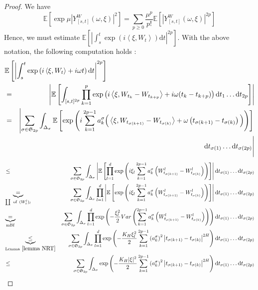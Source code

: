 \documentclass[11pt,a4paper,draft,reqno]{amsart}
\theoremstyle{definition}
\newcommand{\expect}{\mathbb{E}}
\newcommand{\dd}{\mathrm{d}}
\newcommand{\la}{\left\langle}
\newcommand{\ra}{\right\rangle}
\renewcommand{\S}{\mathfrak{S}}
\begin{document}
\begin{proof}
We have
\begin{equation*}
\expect\left[\exp{\mu |Y_{[s,t]}^W(\omega,\xi)|^2}\right]=\sum_{p \ge 0} \frac {\mu^p} {p!}
\expect\left[|Y_{[s,t]}^W(\omega,\xi)|^{2p}\right]
\end{equation*}
Hence, we must estimate
$\expect[|\int_{s}^t \exp( i \la \xi , W_t \ra ) \dd t |^{2p}]$.
With the above notation, the following computation holds :
\begin{eqnarray*}
\lefteqn{\expect\left[\left|\int_{s}^t \exp\left( i \la \xi , W_t \ra + i \omega t\right) \dd t \right|^{2p}\right]}\\
&= &
\left|
	\expect\left[
\int_{ [s,t]^{2p }}\prod_{k=1}^p \exp \left( i \la \xi , W_{t_k}-W_{t_{k+p}} \ra +i \omega (t_k-t_{k+p})\right) \dd t_{1}\dots \dd
t_{2p}
	\right]
\right|\\
& = & 
\left|
	\sum_{\sigma\in\S_{2p}}
		\int_{\Delta_\sigma}
			\expect\left[
\exp\left( i \sum_{k=1}^{2p-1}a_k^{\sigma}\Big( \la \xi, W_{t_{\sigma(k+1)}}-W_{t_{\sigma(k)}}\ra + \omega\left(t_{\sigma(k+1)} -
t_{\sigma(k)}\right)\Big)\right)\right]
		\right.\\ 
		&& 
		\quad\quad\quad\quad\quad\quad\quad\quad\quad\quad\quad\quad\quad\quad\quad\quad\quad\quad\quad\quad\quad\quad\quad\quad\quad\quad
		 \dd t_{\sigma(1)}\dots \dd t_{\sigma(2p)}
\Bigg|\\
\end{eqnarray*}
\begin{eqnarray*}
& \le &
\sum_{\sigma\in\S_{2p}}
	\int_{\Delta_\sigma}
		\left|\expect\left[
\prod_{l=1}^{d}\exp\left( i \xi_l \sum_{k=1}^{2p-1}a_k^{\sigma}\left(W_{t_{\sigma(k+1)}}^l-W_{t_{\sigma(k)}}^l\right) \right)		
		\right]\right|
	\dd t_{\sigma(1)}\dots \dd t_{\sigma(2p)}
\\
& \underbrace {=}_{\coprod\ \mathrm {of\ } (W_t^l)_{l} } & 
\sum_{\sigma\in\S_{2p}}
	\int_{\Delta_\sigma}
		\prod_{l=1}^{d}
			\left|\expect\left[
				\exp\left( 
					i \xi_l \sum_{k=1}^{2p-1}a_k^{\sigma} \left(W_{t_{\sigma(k+1)}}^l-W_{t_{\sigma(k)}}^l\right) 
				\right)
			\right]\right|
	\dd t_{\sigma(1)}\dots \dd t_{\sigma(2p)}
\\
& \underbrace {=}_{\mathrm{mBf}} &
\sum_{\sigma\in\S_{2p}}
	\int_{\Delta_\sigma}
		\prod_{l=1}^{d}
			\exp\left(
				-\frac {\xi_l^2} 2 Var\left(\sum_{k=1}^{2p-1}a_k^{\sigma}\left(W_{t_{\sigma(k+1)}}^l-W_{t_{\sigma(k)}}^l\right)\right)
			\right)
	\dd t_{\sigma(1)}\dots \dd t_{\sigma(2p)}
\\
& \underbrace {\le}_{\mathrm{Lemma} \ \ref{lemma NRT}} &
\sum_{\sigma\in\S_{2p}}
	\int_{\Delta_\sigma}
		\prod_{l=1}^{d}
			\exp\left(
				-\frac {K_H \xi_l^2} 2 \sum_{k=1}^{2p-1}\left(a_k^{\sigma}\right)^2\left|t_{\sigma(k+1)}-t_{\sigma(k)}\right|^{2H}
			\right)
	\dd t_{\sigma(1)}\dots \dd t_{\sigma(2p)}
\\
& \le & 
\sum_{\sigma\in\S_{2p}}
	\int_{\Delta_\sigma}
		\exp\left(
				-\frac {K_H |\xi|^2} 2 \sum_{k=1}^{2p-1}\left(a_k^{\sigma}\right)^2\left|t_{\sigma(k+1)}-t_{\sigma(k)}\right|^{2H}
		\right)
	\dd t_{\sigma(1)}\dots \dd t_{\sigma(2p)}\\
\end{eqnarray*}


\end{proof}
\end{document}
